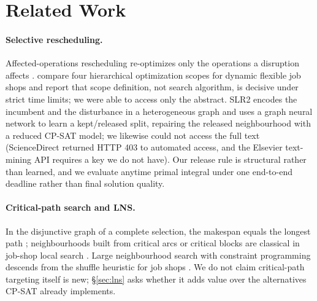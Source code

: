 \documentclass[letterpaper]{article} %
\begin{document}
\section{Related Work}

\paragraph{Selective rescheduling.} Affected-operations rescheduling re-optimizes only the operations a disruption affects \citep{abumaizar1997,subramaniam2003}. \citet{sun2026} compare four hierarchical optimization scopes for dynamic flexible job shops and report that scope definition, not search algorithm, is decisive under strict time limits; we were able to access only the abstract. SLR2 \citep{linyang2026} encodes the incumbent and the disturbance in a heterogeneous graph and uses a graph neural network to learn a kept/released split, repairing the released neighbourhood with a reduced CP-SAT model; we likewise could not access the full text (ScienceDirect returned HTTP 403 to automated access, and the Elsevier text-mining API requires a key we do not have). Our release rule is structural rather than learned, and we evaluate anytime primal integral under one end-to-end deadline rather than final solution quality.

\paragraph{Critical-path search and LNS.} In the disjunctive graph of a complete selection, the makespan equals the longest path \citep{balas1969}; neighbourhoods built from critical arcs or critical blocks are classical in job-shop local search \citep{vanlaarhoven1992,nowicki1996,balas1998}. Large neighbourhood search with constraint programming \citep{shaw1998,godard2005,pacino2011} descends from the shuffle heuristic for job shops \citep{applegate1991}. We do not claim critical-path targeting itself is new; \S\ref{sec:lns} asks whether it adds value over the alternatives CP-SAT already implements.
\end{document}
